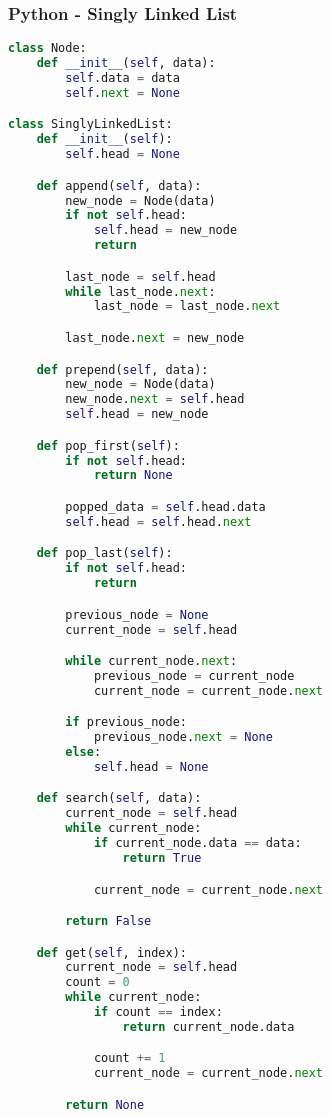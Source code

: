 \subsubsection{Python - Singly Linked List}

\begin{lstlisting}[language=Python]
class Node:
    def __init__(self, data):
        self.data = data
        self.next = None

class SinglyLinkedList:
    def __init__(self):
        self.head = None

    def append(self, data):
        new_node = Node(data)
        if not self.head:
            self.head = new_node
            return

        last_node = self.head
        while last_node.next:
            last_node = last_node.next

        last_node.next = new_node

    def prepend(self, data):
        new_node = Node(data)
        new_node.next = self.head
        self.head = new_node

    def pop_first(self):
        if not self.head:
            return None

        popped_data = self.head.data
        self.head = self.head.next

    def pop_last(self):
        if not self.head:
            return

        previous_node = None
        current_node = self.head

        while current_node.next:
            previous_node = current_node
            current_node = current_node.next

        if previous_node:
            previous_node.next = None
        else:
            self.head = None

    def search(self, data):
        current_node = self.head
        while current_node:
            if current_node.data == data:
                return True

            current_node = current_node.next

        return False

    def get(self, index):
        current_node = self.head
        count = 0
        while current_node:
            if count == index:
                return current_node.data

            count += 1
            current_node = current_node.next

        return None


\end{lstlisting}
